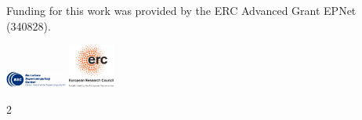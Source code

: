 \documentclass[a1paper,portrait,showframe,fontscale=.45]{baposter}
\begin{document}
\begin{poster}
{\begin{multicols}{2}
				Funding for this work was provided by the ERC Advanced Grant EPNet (340828).
				\begin{center}
					\includegraphics[width=2cm]{logos/bscLogo.jpg}
					\includegraphics[width=1.5cm]{logos/LOGO-ERC.jpg}
				\end{center}
				\end{multicols}{2}
			} 

		\end{poster}

		
\end{document}
